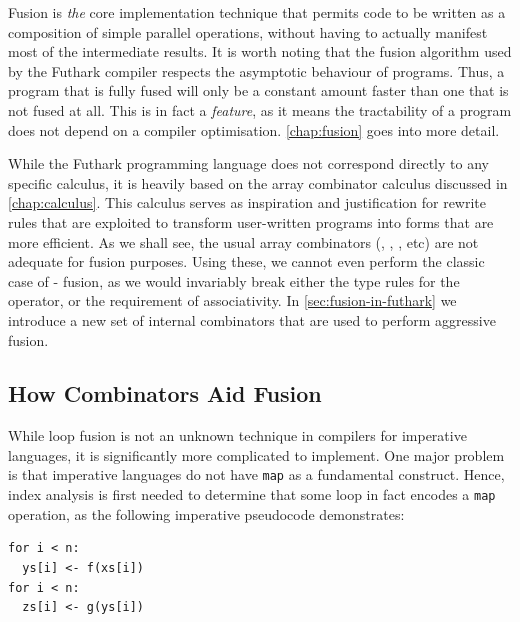 Fusion is \textit{the} core implementation technique that permits code
to be written as a composition of simple parallel operations, without
having to actually manifest most of the intermediate results.  It is
worth noting that the fusion algorithm used by the Futhark compiler
respects the asymptotic behaviour of programs.  Thus, a program that
is fully fused will only be a constant amount faster than one that is
not fused at all.  This is in fact a \textit{feature}, as it means the
tractability of a program does not depend on a compiler optimisation.
\cref{chap:fusion} goes into more detail.

While the Futhark programming language does not correspond directly to
any specific calculus, it is heavily based on the array combinator
calculus discussed in \cref{chap:calculus}.  This calculus serves as
inspiration and justification for rewrite rules that are exploited to
transform user-written programs into forms that are more efficient.
As we shall see, the usual array combinators (, ,
, etc) are not adequate for fusion purposes.  Using these, we
cannot even perform the classic case of - fusion,
as we would invariably break either the type rules for the 
operator, or the requirement of associativity.  In
\cref{sec:fusion-in-futhark} we introduce a new set of internal
combinators that are used to perform aggressive fusion.

\subsection{How Combinators Aid Fusion}

While loop fusion is not an unknown technique in compilers for
imperative languages, it is significantly more complicated to
implement.  One major problem is that imperative languages do not have
\lstinline{map} as a fundamental construct.  Hence, index analysis is
first needed to determine that some loop in fact encodes a
\lstinline{map} operation, as the following imperative pseudocode
demonstrates:

\begin{lstlisting}
for i < n:
  ys[i] <- f(xs[i])
for i < n:
  zs[i] <- g(ys[i])
\end{lstlisting}

